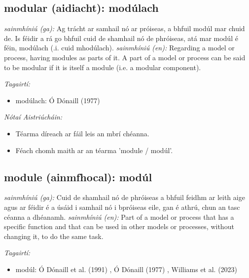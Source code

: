 \documentclass{article}
\begin{document}
\subsection*{modular (aidiacht): modúlach} 
 \noindent \textit{sainmhíniú (ga):} Ag trácht ar samhail nó ar próiseas, a bhfuil modúl mar chuid de. Is féidir a rá go bhfuil cuid de shamhail nó de phróiseas, atá mar modúl é féin, modúlach (.i. cuid mhodúlach).
\newline\newline
 \noindent \textit{sainmhíniú (en):} Regarding a model or process, having modules as parts of it. A part of a model or process can be said to be modular if it is itself a module (i.e. a modular component).
\newline

 \noindent \textit{Tagairtí:}
\begin{itemize}
	\item modúlach: Ó Dónaill (1977) \cite{odonaill}
\end{itemize}

 \noindent \textit{Nótaí Aistriúcháin:}
\begin{itemize}
	\item Téarma díreach ar fáil leis an mbrí chéanna.
	\item Féach chomh maith ar an téarma 'module / modúl'.
\end{itemize}


\subsection*{module (ainmfhocal): modúl} 
 \noindent \textit{sainmhíniú (ga):} Cuid de shamhail nó de phróiseas a bhfuil feidhm ar leith aige agus ar féidir é a úsáid i samhail nó i bpróiseas eile, gan é athrú, chun an tasc céanna a dhéanamh.
\newline\newline
 \noindent \textit{sainmhíniú (en):} Part of a model or process that has a specific function and that can be used in other models or processes, without changing it, to do the same task.
\newline

 \noindent \textit{Tagairtí:}
\begin{itemize}
	\item modúl: Ó Dónaill et al. (1991) \cite{focloir-beag}, Ó Dónaill (1977) \cite{odonaill}, Williams et al. (2023) \cite{storchiste}
\end{itemize}
\end{document}
